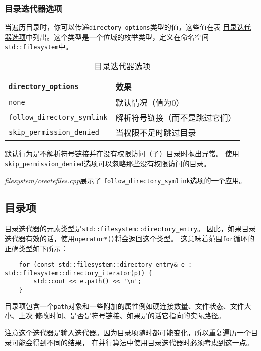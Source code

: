 \subsubsection{目录迭代器选项}
当遍历目录时，你可以传递\texttt{directory\_options}类型的值，这些值在表
\hyperref[t20.21]{目录迭代器选项}中列出。这个类型是一个位域的枚举类型，定义在命名空间
\texttt{std::filesystem}中。
\begin{table}[htb]
    \centering
    \begin{tabular}{l|l}
        \hline
        \texttt{directory\_options}         & \textbf{效果}     \\
        \hline
        \texttt{none}                       & 默认情况（值为0）       \\
        \texttt{follow\_directory\_symlink} & 解析符号链接（而不是跳过它们） \\
        \texttt{skip\_permission\_denied}   & 当权限不足时跳过目录      \\
        \hline
    \end{tabular}
    \caption{目录迭代器选项}
    \label{t20.21}
\end{table}

默认行为是不解析符号链接并在没有权限访问（子）目录时抛出异常。
使用\texttt{skip\_permission\_denied}选项可以忽略那些没有权限访问的目录。

\hyperref[ch20.1.3]{\emph{filesystem/createfiles.cpp}}展示了
\texttt{follow\_directory\_symlink}选项的一个应用。

\subsection{目录项}
目录迭代器的元素类型是\texttt{std::filesystem::directory\_entry}。
因此，如果目录迭代器有效的话，使用\texttt{operator*()}将会返回这个类型。
这意味着范围\texttt{for}循环的正确类型如下所示：
\begin{lstlisting}
    for (const std::filesystem::directory_entry& e : std::filesystem::directory_iterator(p)) {
        std::cout << e.path() << '\n';
    }
\end{lstlisting}
目录项包含一个\texttt{path}对象和一些附加的属性例如硬连接数量、文件状态、文件大小、上次
修改时间、是否是符号链接、如果是的话它指向的实际路径。

注意这个迭代器是输入迭代器。因为目录项随时都可能变化，所以重复遍历一个目录可能会得到不同的结果，
\hyperref[ch22.6.1.4]{在并行算法中使用目录迭代器}时必须考虑到这一点。

